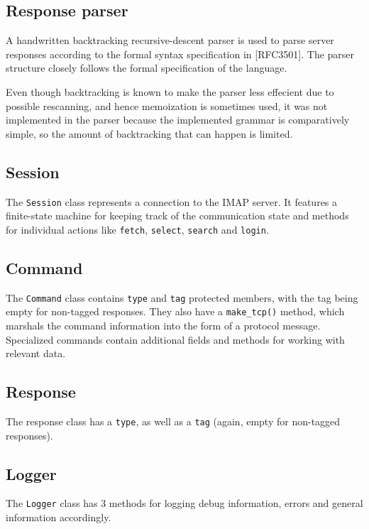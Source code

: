 \documentclass[a4]{report}
\begin{document}
\subsection{Response parser}

A handwritten backtracking recursive-descent parser is used to parse server responses according to the formal syntax specification in [RFC3501]. The parser structure closely follows the formal specification of the language.

Even though backtracking is known to make the parser less effecient due to possible rescanning, and hence memoization is sometimes used, it was not implemented in the parser because the implemented grammar is comparatively simple, so the amount of backtracking that can happen is limited.

\subsection{Session}

The \texttt{Session} class represents a connection to the IMAP server. It features a finite-state machine for keeping track of the communication state and methods for individual actions like \texttt{fetch}, \texttt{select}, \texttt{search} and \texttt{login}.

\subsection{Command}

The \texttt{Command} class contains \texttt{type} and \texttt{tag} protected members, with the tag being empty for non-tagged responses. They also have a \texttt{make\_tcp()} method, which marshals the command information into the form of a protocol message. Specialized commands contain additional fields and methods for working with relevant data.

\subsection{Response}

The response class has a \texttt{type}, as well as a \texttt{tag} (again, empty for non-tagged responses).

\subsection{Logger}

The \texttt{Logger} class has 3 methods for logging debug information, errors and general information accordingly.
\end{document}
